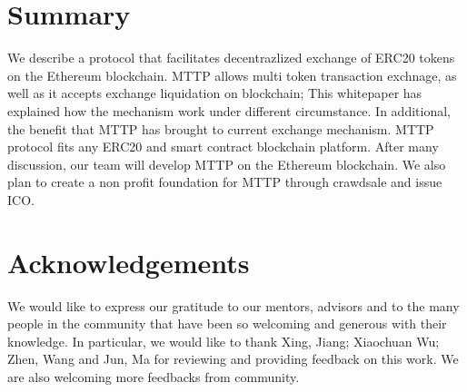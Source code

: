 \documentclass[UTF8,nofonts]{article}
\begin{document}

\section{Summary\label{sec: summary}}

We describe a protocol that facilitates decentrazlized exchange of ERC20 tokens on the Ethereum blockchain. MTTP allows multi token transaction exchnage,  as well as it accepts exchange liquidation on blockchain; This whitepaper has explained how the mechanism work under different circumstance. In additional,  the benefit that MTTP has brought to current exchange mechanism.
MTTP protocol fits any ERC20 and smart contract blockchain platform. After many discussion,  our team will develop MTTP on the Ethereum blockchain.
We also plan to create a non profit foundation for MTTP through crawdsale and issue ICO.

\section{Acknowledgements\label{sec: acknowledgement}}

We would like to express our gratitude to our mentors,  advisors and to the many people in the community that have been so welcoming and generous with their knowledge. In particular,  we would like to thank Xing,  Jiang; Xiaochuan Wu; Zhen, Wang and Jun, Ma for reviewing and providing feedback on this work. We are also welcoming more feedbacks from community.

\newpage


\end{document}
